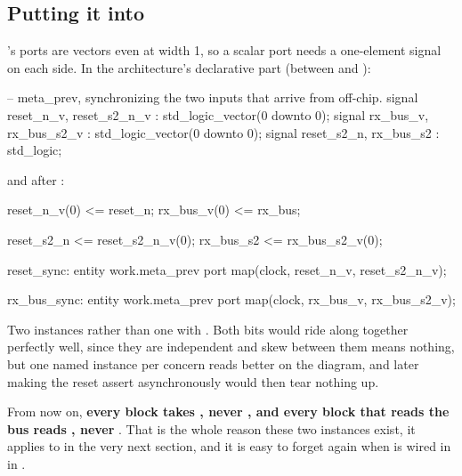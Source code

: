 \subsection{Putting it into }
\label{c12:sub:mpwire}

's ports are vectors even at width 1, so a scalar port needs a one-element signal on
each side. In the architecture's declarative part (between  and ):

\begin{vhdlcode}
    -- meta_prev, synchronizing the two inputs that arrive from off-chip.
    signal reset_n_v, reset_s2_n_v : std_logic_vector(0 downto 0);
    signal rx_bus_v,  rx_bus_s2_v  : std_logic_vector(0 downto 0);
    signal reset_s2_n, rx_bus_s2   : std_logic;
\end{vhdlcode}

and after :

\begin{vhdlcode}
    reset_n_v(0) <= reset_n;
    rx_bus_v(0)  <= rx_bus;

    reset_s2_n <= reset_s2_n_v(0);
    rx_bus_s2  <= rx_bus_s2_v(0);

    reset_sync: entity work.meta_prev
        port map(clock, reset_n_v, reset_s2_n_v);

    rx_bus_sync: entity work.meta_prev
        port map(clock, rx_bus_v, rx_bus_s2_v);
\end{vhdlcode}

Two instances rather than one with . Both bits would ride along together perfectly
well, since they are independent and skew between them means nothing, but one named instance per
concern reads better on the diagram, and later making the reset assert asynchronously would then tear
nothing up.

From now on, \textbf{every block takes , never , and every block that
reads the bus reads , never }. That is the whole reason these two
instances exist, it applies to  in the very next section, and it is easy to forget
again when  is wired in in .
